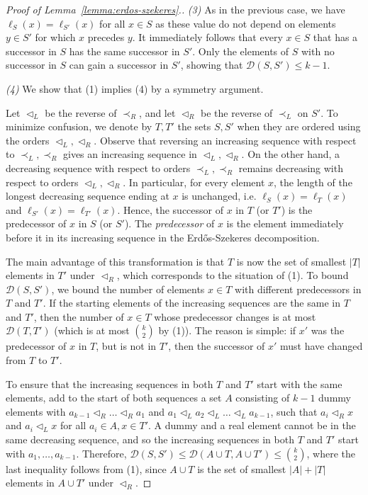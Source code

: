 \documentclass[11pt]{amsart}
\theoremstyle{definition}
\newcommand{\cD}{\mathcal{D}}
\begin{document}
\begin{proof}[Proof of Lemma~\ref{lemma:erdos-szekeres}.]
\bigskip
\noindent
\textit{(3)} As in the previous case, we have $\ell_S(x) =  \ell_{S'}(x)$ for all $x \in S$ as these value do not depend on elements $y\in S'$ for which $x$ precedes $y$. It immediately follows that every $x \in S$ that has a successor in $S$ has the same successor in $S'$. Only the elements of $S$ with no successor in $S$ can gain a successor in $S'$, showing that $\cD(S,S')\leq k-1$.

\bigskip
\noindent
\textit{(4)} We show that (1) implies (4) by a symmetry argument.

Let $\lhd_L$ be the reverse of $\prec_R$, and let $\lhd_R$ be the reverse of $\prec_L$ on $S'$. To minimize confusion, we denote by $T, T'$ the sets $S, S'$ when they are ordered using the orders $\lhd_L, \lhd_R$. Observe that reversing an increasing sequence with respect to $\prec_L, \prec_R$ gives an increasing sequence in $\lhd_L, \lhd_R$. On the other hand, a decreasing sequence with respect to orders $\prec_L, \prec_R$ remains decreasing with respect to orders $\lhd_L, \lhd_R$. In particular, for every element $x$, the length of the longest decreasing sequence ending at $x$ is unchanged, i.e. $\ell_S(x)=\ell_T(x)$ and $\ell_{S'}(x)=\ell_{T'}(x)$. Hence, the successor of $x$ in $T$ (or $T'$) is the predecessor of $x$ in $S$ (or $S'$). The \textit{predecessor} of $x$ is the element immediately before it in its increasing sequence in the Erd\H{o}s-Szekeres decomposition.

The main advantage of this transformation is that $T$ is now the set of smallest $|T|$ elements in $T'$ under $\lhd_R$, which corresponds to the situation of (1). 
To bound $\cD(S, S')$, we bound the number of elements $x\in T$ with different predecessors in $T$ and $T'$. If the starting elements of the increasing sequences are the same in $T$ and $T'$, then the number of $x\in T$ whose predecessor changes is at most $\cD(T, T')$ (which is at most $ \binom{k}{2}$ by (1)). 
The reason is simple: if $x'$ was the predecessor of $x$ in $T$, but is not in $T'$, then the successor of $x'$ must have changed from $T$ to $T'$. 

To ensure that the increasing sequences in both $T$ and $T'$ start with the same elements, add to the start of both sequences a set $A$ consisting of $k-1$ dummy elements with $a_{k-1}\lhd_R \dots\lhd_R a_{1}$ and $a_1\lhd_L a_2\lhd_L\dots\lhd_L a_{k-1}$, such that $a_i\lhd_R x$ and $a_i\lhd_L x$ for all $a_i\in A, x\in T'$. A dummy and a real element cannot be in the same decreasing sequence, and so the increasing sequences in both $T$ and $T'$ start with $a_1, \dots, a_{k-1}$. Therefore, $\cD(S, S')\leq \cD(A\cup T, A\cup T')\leq \binom{k}{2}$, where the last inequality follows from (1), since $A\cup T$ is the set of smallest $|A|+|T|$ elements in $A\cup T'$ under $\lhd_R$.
\end{proof}   
\end{document}
